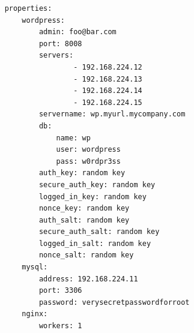 \begin{adjustwidth}{2.5em}{2.5em}
\begin{verbatim}
    properties:
        wordpress:
            admin: foo@bar.com
            port: 8008
            servers:
                    - 192.168.224.12
                    - 192.168.224.13
                    - 192.168.224.14
                    - 192.168.224.15
            servername: wp.myurl.mycompany.com
            db:
                name: wp
                user: wordpress
                pass: w0rdpr3ss
            auth_key: random key
            secure_auth_key: random key
            logged_in_key: random key
            nonce_key: random key
            auth_salt: random key
            secure_auth_salt: random key
            logged_in_salt: random key
            nonce_salt: random key
        mysql:
            address: 192.168.224.11
            port: 3306
            password: verysecretpasswordforroot
        nginx:
            workers: 1

\end{verbatim}
\end{adjustwidth}




